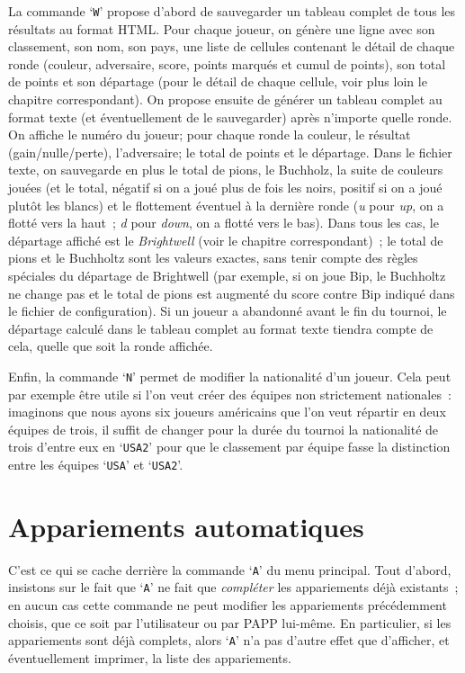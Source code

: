 \documentclass[10pt]{article}
\begin{document}
    La commande `\verb|W|' propose d'abord de sauvegarder un tableau
complet de tous les r\'esultats au format HTML. Pour chaque joueur,
on g\'en\`ere une ligne avec son classement, son nom, son pays,
une liste de cellules contenant le d\'etail de chaque ronde
(couleur, adversaire, score, points marqu\'es et cumul de points),
son total de points et son d\'epartage (pour le d\'etail de chaque
cellule, voir plus loin le chapitre correspondant). On propose ensuite de
g\'en\'erer un tableau complet au format texte (et \'eventuellement de
le sauvegarder) apr\`es n'importe quelle ronde. On affiche le num\'ero
du joueur; pour chaque ronde la couleur, le r\'esultat (gain/nulle/perte),
l'adversaire; le total de points et le d\'epartage. Dans le fichier
texte, on sauvegarde en plus le total de pions, le Buchholz, la suite
de couleurs jou\'ees (et le total, n\'egatif si on a jou\'e plus de fois
les noirs, positif si on a jou\'e plut\^ot les blancs) et le flottement
\'eventuel \`a la derni\`ere ronde ({\em u} pour {\em up}, on a flott\'e
vers la haut~; {\em d} pour {\em down}, on a flott\'e vers le bas).
Dans tous les cas, le d\'epartage affich\'e est le {\em Brightwell}
(voir le chapitre correspondant)~; le total de pions et le Buchholtz
sont les valeurs exactes, sans tenir compte des r\`egles sp\'eciales
du d\'epartage de Brightwell (par exemple, si on joue Bip, le Buchholtz
ne change pas et le total de pions est augment\'e du score contre Bip
indiqu\'e dans le fichier de configuration). Si un joueur a abandonn\'e
avant le fin du tournoi, le d\'epartage calcul\'e dans le tableau complet
au format texte tiendra compte de cela, quelle que soit la ronde affich\'ee.

Enfin, la commande `\verb|N|' permet de modifier la nationalit\'e d'un
joueur. Cela peut par exemple \^etre utile si l'on veut cr\'eer des
\'equipes non strictement nationales~: imaginons que nous ayons six 
joueurs am\'ericains que l'on veut r\'epartir en deux \'equipes de trois, 
il suffit de changer pour la dur\'ee du tournoi la nationalit\'e de 
trois d'entre eux en `\verb|USA2|' pour que le classement par \'equipe
fasse la distinction entre les \'equipes `\verb|USA|' et `\verb|USA2|'.


\section{Appariements automatiques}

C'est ce qui se cache derri\`ere la commande `\verb|A|' du menu 
principal.  Tout d'abord, insistons sur le fait que `\verb|A|' ne fait 
que {\em compl\'eter\/} les appariements d\'ej\`a existants~; en aucun 
cas cette commande ne peut modifier les appariements pr\'ec\'edemment 
choisis, que ce soit par l'utilisateur ou par PAPP lui-m\^eme.  En 
particulier, si les appariements sont d\'ej\`a complets, alors 
`\verb|A|' n'a pas d'autre effet que d'afficher, et \'eventuellement 
imprimer, la liste des appariements.
\end{document}
